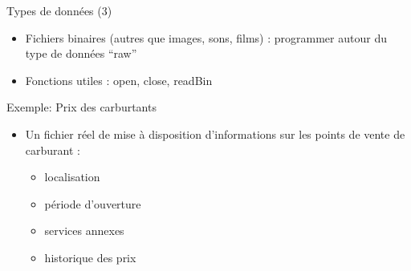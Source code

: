 \documentclass[
  ignorenonframetext,
]{beamer}
\providecommand{\tightlist}{%
  \setlength{\itemsep}{0pt}\setlength{\parskip}{0pt}}
\begin{document}
\begin{frame}{Types de données (3)}
\protect\hypertarget{types-de-donnuxe9es-3}{}
\begin{itemize}
\tightlist
\item
  Fichiers binaires (autres que images, sons, films) : programmer autour
  du type de données ``raw''
\item
  Fonctions utiles : open, close, readBin
\end{itemize}
\end{frame}

\begin{frame}{Exemple: Prix des carburtants}
\protect\hypertarget{exemple-prix-des-carburtants}{}
\begin{itemize}
\tightlist
\item
  Un fichier réel de mise à disposition d'informations sur les points de
  vente de carburant :

  \begin{itemize}
  \tightlist
  \item
    localisation
  \item
    période d'ouverture
  \item
    services annexes
  \item
    historique des prix
  \end{itemize}
\end{itemize}

\tiny

\normalsize
\end{frame}
\end{document}
